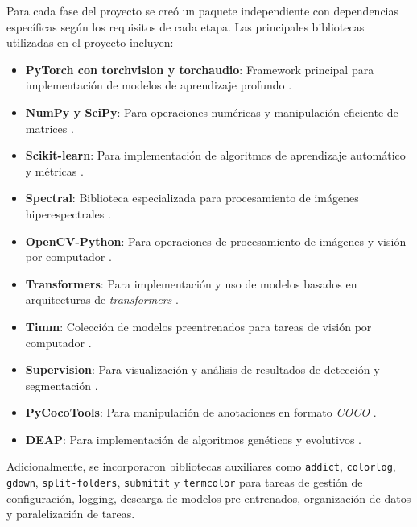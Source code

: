 \vspace{5mm}

Para cada fase del proyecto se creó un paquete independiente con dependencias específicas según los requisitos de cada etapa. Las principales bibliotecas utilizadas en el proyecto incluyen:

\begin{itemize}
    \item \textbf{PyTorch con torchvision y torchaudio}: Framework principal para implementación de modelos de aprendizaje profundo \cite{NEURIPS2019_9015}. 
    \item \textbf{NumPy y SciPy}: Para operaciones numéricas y manipulación eficiente de matrices \cite{2020NumPy-Array, 2020SciPy-NMeth}.
    \item \textbf{Scikit-learn}: Para implementación de algoritmos de aprendizaje automático y métricas \cite{sklearn_api}.
    \item \textbf{Spectral}: Biblioteca especializada para procesamiento de imágenes hiperespectrales \cite{thomas_boggs_2022_7135091}.
    \item \textbf{OpenCV-Python}: Para operaciones de procesamiento de imágenes y visión por computador \cite{opencv_library}.
    \item \textbf{Transformers}: Para implementación y uso de modelos basados en arquitecturas de \emph{transformers} \cite{wolf-etal-2020-transformers}.
    \item \textbf{Timm}: Colección de modelos preentrenados para tareas de visión por computador \cite{rw2019timm}.
    \item \textbf{Supervision}: Para visualización y análisis de resultados de detección y segmentación \cite{Roboflow_Supervision}.
    \item \textbf{PyCocoTools}: Para manipulación de anotaciones en formato \emph{COCO} \cite{Welsh2018,Hoops2006,Medley2018}.
    \item \textbf{DEAP}: Para implementación de algoritmos genéticos y evolutivos \cite{DEAP_JMLR2012}.
\end{itemize}

\sloppy
Adicionalmente, se incorporaron bibliotecas auxiliares como \texttt{addict}, \texttt{colorlog}, \texttt{gdown}, \texttt{split-folders}, \texttt{submitit} y \texttt{termcolor} para tareas de gestión de configuración, logging, descarga de modelos pre-entrenados, organización de datos y paralelización de tareas.

\vspace{5mm}

